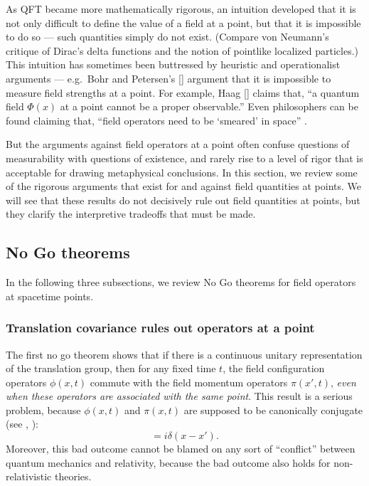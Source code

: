 \documentclass[12pt]{article}
\theoremstyle{definition}
\theoremstyle{definition}
\newcommand{\mb}[1]{#1}
\theoremstyle{remark}
\begin{document}
As QFT became more mathematically rigorous, an intuition developed
that it is not only difficult to define the value of a field at a
point, but that it is impossible to do so --- such quantities simply
do not exist.  (Compare von Neumann's critique of Dirac's delta
functions and the notion of pointlike localized particles.)  This
intuition has sometimes been buttressed by heuristic and
operationalist arguments --- e.g.\ Bohr and Petersen's
[\citeyear{bohr}] argument that it is impossible to measure field
strengths at a point.  For example, Haag [\citeyear[p.\ 58]{haag}]
claims that, ``a quantum field $\Phi (x)$ at a point cannot be a
proper observable.''  Even philosophers can be found claiming that,
``field operators need to be `smeared' in space'' \cite[p.\ 631, fn.\
8]{nhug}.

But the arguments against field operators at a point often confuse
questions of measurability with questions of existence, and rarely
rise to a level of rigor that is acceptable for drawing metaphysical
conclusions.  In this section, we review some of the rigorous
arguments that exist for and against field quantities at points.  We
will see that these results do not decisively rule out field
quantities at points, but they clarify the interpretive tradeoffs that
must be made.

\subsection{No Go theorems}

In the following three subsections, we review No Go theorems for field
operators at spacetime points.  


\subsubsection{Translation covariance rules out operators at a point}

The first no go theorem shows that if there is a continuous unitary representation of
the translation group, then for any fixed time $t$, the field configuration operators
$\phi (\mb{x},t)$ commute with the field momentum operators $\pi (\mb{x}',t)$,
\emph{even when these operators are associated with the same point}.  This result is
a serious problem, because $\phi (\mb{x},t)$ and $\pi (\mb{x},t)$ are supposed to be
canonically conjugate (see \cite[p.\ 131]{ryder}, \cite{huggett}):
\begin{equation} [\phi (\mb{x},t),\pi (\mb{x}',t)]=i\delta
  (\mb{x}-\mb{x}') .\end{equation} Moreover, this bad outcome cannot
be blamed on any sort of ``conflict'' between quantum mechanics and
relativity, because the bad outcome also holds for non-relativistic
theories.
\end{document}
